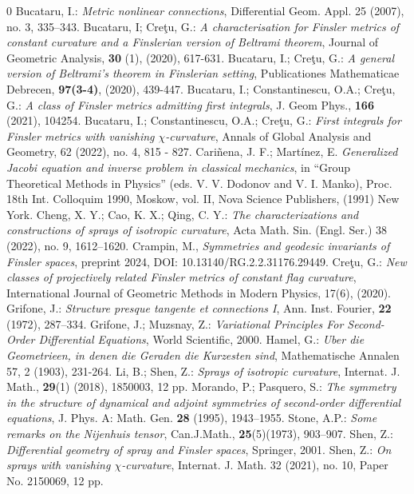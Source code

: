 \documentclass[oneside,english]{amsart}
\theoremstyle{definition}
\theoremstyle{plain}
\theoremstyle{plain}
\theoremstyle{plain}
\theoremstyle{remark}
\theoremstyle{remark}
\theoremstyle{remark}
\begin{document}
\begin{thebibliography}{0} 
 {Bucataru, I.}: \emph{Metric nonlinear connections}, Differential Geom. Appl. 25 (2007), no. 3, 335--343.
 {Bucataru, I; Cre\c tu, G.}: \emph{A characterisation for Finsler metrics of constant curvature and a Finslerian version of Beltrami theorem}, Journal of Geometric Analysis, {\bf 30} (1), (2020), 617-631. 
 {Bucataru, I.; Cre\c tu, G.}: \emph{A general version of Beltrami's theorem in Finslerian setting}, Publicationes Mathematicae Debrecen, \textbf{97(3-4)}, (2020), 439-447.
 {Bucataru, I.; Constantinescu, O.A.; Cre\c tu, G.}:
\emph{A class of Finsler metrics admitting first integrals}, J. Geom Phys., \textbf{166} (2021), 104254.
 {Bucataru, I.; Constantinescu, O.A.; Cre\c tu, G.}: \emph{First integrals for Finsler metrics with vanishing $\chi$-curvature}, Annals of Global Analysis and Geometry, 62 (2022), no. 4, 815 - 827. 
 {Cari\~nena, J. F.; Mart\'inez, E.} \emph{Generalized Jacobi equation and inverse problem in classical mechanics}, in ``Group
Theoretical Methods in Physics'' (eds. V. V. Dodonov and V. I.
Manko), Proc. 18th Int. Colloquim 1990, Moskow, vol. II, Nova
Science Publishers, (1991) New York.
 {Cheng, X. Y.; Cao, K. X.; Qing, C. Y.}: \emph{The characterizations and constructions of sprays of isotropic curvature}, Acta Math. Sin. (Engl. Ser.) 38 (2022), no. 9, 1612–1620.
 {Crampin, M.}, \emph{Symmetries and geodesic invariants of Finsler spaces}, preprint 2024, DOI: 10.13140/RG.2.2.31176.29449.
 {Cre\c tu, G.}: \emph{New classes of projectively related Finsler metrics of constant flag curvature},  International Journal of Geometric Methods in Modern Physics, 17(6), (2020).
 {Grifone, J.}: \emph{Structure presque tangente et
    connections I}, Ann. Inst. Fourier, {\bf 22}  (1972), 287--334.
 {Grifone, J.; Muzsnay, Z.}: \emph{Variational Principles For Second-Order Differential Equations}, World Scientific, 2000.
 {Hamel, G.}: \emph{Uber die Geometrieen, in denen die Geraden die Kurzesten sind}, Mathematische Annalen 57, 2 (1903), 231-264.
 {Li, B.; Shen, Z.}: \emph{Sprays of isotropic curvature}, 
Internat. J. Math., \textbf{29}(1) (2018),  1850003, 12 pp.
 {Morando, P.; Pasquero, S.}: \emph{The symmetry in the structure of dynamical and adjoint symmetries of second-order differential equations}, J. Phys. A: Math. Gen. \textbf{28} (1995), 1943--1955.
 {Stone, A.P.}: \emph{Some remarks on the Nijenhuis tensor}, Can.J.Math., \textbf{25}(5)(1973), 903--907. 
 {Shen, Z.}: \emph{Differential geometry of spray and
Finsler spaces}, Springer, 2001.
 {Shen, Z.}: \emph{On sprays with vanishing  $\chi$-curvature}, Internat. J. Math. 32 (2021), no. 10, Paper No. 2150069, 12 pp.

\end{thebibliography}
\end{document}

